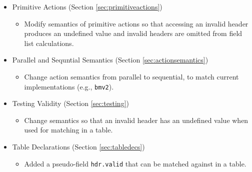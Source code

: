 \documentclass[12pt]{article}
\begin{document}

\begin{itemize}
\item Primitive Actions (Section \ref{sec:primitiveactions})
\begin{itemize}
\item Modify semantics of primitive actions so that accessing an invalid header produces an undefined value and invalid headers are omitted from field list calculations.
\end{itemize}
\item Parallel and Sequntial Semantics (Section \ref{sec:actionsemantics})
\begin{itemize}
\item Change action semantics from parallel to sequential, to match current implementations (e.g., \texttt{bmv2}).
\end{itemize}
\item Testing Validity (Section \ref{sec:testing})
\begin{itemize}
\item Change semantics so that an invalid header has an undefined value when used for matching in a table.
\end{itemize}
\item Table Declarations (Section \ref{sec:tabledecs})
\begin{itemize}
\item Added a pseudo-field \texttt{hdr.valid} that can be matched against in a table.
\end{itemize}
\end{itemize}

\end{document}
